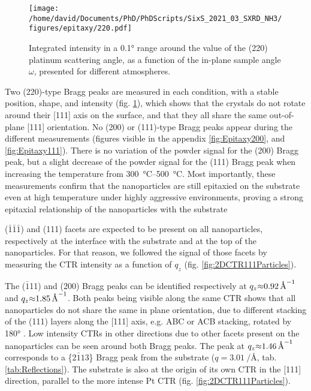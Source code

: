 \begin{figure}[!htb]
    \centering
    \texttt{[image: /home/david/Documents/PhD/PhDScripts/SixS\_2021\_03\_SXRD\_NH3/figures/epitaxy/220.pdf]}
    \caption{
        Integrated intensity in a \ang{0.1} range around the value of the (220) platinum scattering angle, as a function of the in-plane sample angle $\omega$, presented for different atmospheres.
    }
    \label{fig:Epitaxy220}
\end{figure}

Two (220)-type Bragg peaks are measured in each condition, with a stable position, shape, and intensity (fig. \ref{fig:Epitaxy220}), which shows that the crystals do not rotate around their [111] axis on the surface, and that they all share the same out-of-plane [111] orientation.
No (200) or (111)-type Bragg peaks appear during the different measurements (figures visible in the appendix \ref{fig:Epitaxy200}, and \ref{fig:Epitaxy111}).
There is no variation of the powder signal for the (200) Bragg peak, but a slight decrease of the powder signal for the (111) Bragg peak when increasing the temperature from \qtyrange{300}{500}{\degreeCelsius}.
Most importantly, these measurements confirm that the nanoparticles are still epitaxied on the substrate even at high temperature under highly aggressive environments, proving a strong epitaxial relationship of the nanoparticles with the substrate

($\bar{1}\bar{1}\bar{1}$) and (111) facets are expected to be present on all nanoparticles, respectively at the interface with the substrate and at the top of the nanoparticles.
For that reason, we followed the signal of those facets by measuring the CTR intensity as a function of $q_z$ (fig. \ref{fig:2DCTR111Particles}).

The ($\bar{1}$11) and (200) Bragg peaks can be identified respectively at $q_z \qty{\approx0.92}{\per\angstrom}$ and $q_z \qty{\approx1.85}{\per\angstrom}$.
Both peaks being visible along the same CTR shows that all nanoparticles do not share the same in plane orientation, due to different stacking of the (111) layers along the [111] axis, e.g. ABC or ACB stacking, rotated by \ang{180} \parencite{Jones2019}.
Low intensity CTRs in other directions due to other facets present on the nanoparticles can be seen around both Bragg peaks.
The peak at $q_z \qty{\approx1.46}{\per\angstrom}$ corresponds to a \{2$\bar{1}1$3\} Bragg peak from the  substrate ($q = \qty{3.01}{\per\angstrom}$, tab. \ref{tab:Reflections}).
The substrate is also at the origin of its own CTR in the [111] direction, parallel to the more intense Pt CTR (fig. \ref{fig:2DCTR111Particles}).

